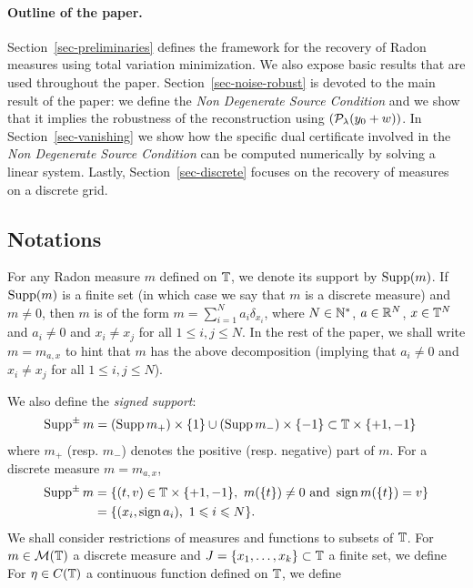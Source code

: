 \paragraph{Outline of the paper.}

Section~\ref{sec-preliminaries} defines the framework for the recovery of Radon measures using total variation minimization. We also expose basic results that are used throughout the paper. Section~\ref{sec-noise-robust} is devoted to the main result of the paper: we define the \textit{Non Degenerate Source Condition} and we show that it implies the robustness of the reconstruction using $(\mathcal{P}_\lambda(y_0+w))$. In Section~\ref{sec-vanishing} we show how the specific dual certificate involved in the \textit{Non Degenerate Source Condition} can be computed numerically by solving a linear system. Lastly, Section~\ref{sec-discrete} focuses on the recovery of measures on a discrete grid.
 

\subsection{Notations}

For any Radon measure $m$ defined on $\mathbb{T}$, we denote its support by $\operatorname{Supp}(m)$.
If $\operatorname{Supp}(m)$ is a finite set (in which case we say that $m$ is a discrete measure) and $m\neq 0$, then
 $m$ is of the form $m= \sum_{i=1}^N a_i \delta_{x_i}$, where $N\in \mathbb{N}^*$, $a\in \mathbb{R}^N$, $x\in \mathbb{T}^N$
 and $a_i\neq 0$ and $x_i\neq x_j$ for all $1\leq i,j\leq N$. In the rest of the paper, we shall write $m=m_{a,x}$
to  hint that $m$ has the above decomposition (implying that $a_i\neq 0$ and $x_i\neq x_j$ for all $1\leq i,j\leq N$). 

We also define the \textit{signed support}:
\begin{align*}
  \operatorname{Supp^{\pm}} m &= (\operatorname{Supp} m_+) \times \{1\}\cup (\operatorname{Supp} m_-)\times\{-1\} \subset \mathbb{T} \times \{+1,-1 \}
\end{align*}
where $m_+$ (resp. $m_-$) denotes the positive (resp. negative) part of $m$.
For a discrete measure $m=m_{a,x}$, 
\begin{align*}
\operatorname{Supp^{\pm}} m &=\left\{(t,v)\in \mathbb{T}\times \{+1,-1\}, \ m(\{t \})\neq 0 \mbox{ and } \operatorname{sign} m(\{t \})=v \right\}\\
&= \{(x_i,\operatorname{sign} a_i), \ 1\leqslant i\leqslant N\}.
\end{align*}
We shall consider restrictions of measures and functions to subsets of $\mathbb{T}$. For $m \in \mathcal{M}(\mathbb{T})$ a discrete measure and $J=\{x_1,\ldots,x_k\} \subset \mathbb{T}$ a finite set, we define 
For $\eta \in C(\mathbb{T})$ a continuous function defined on $\mathbb{T}$, we define



